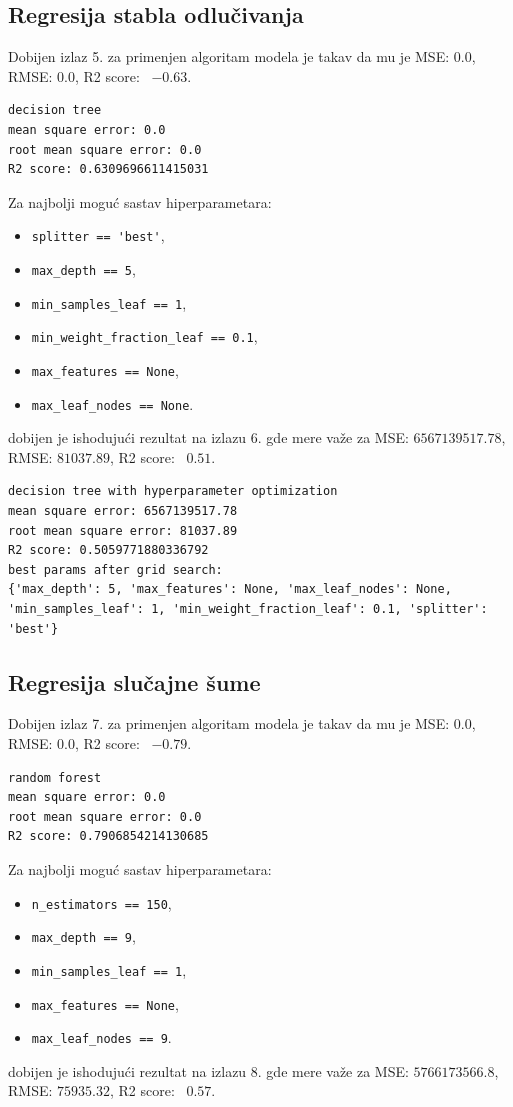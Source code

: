 \documentclass[fontsize=12bp, paper=a4]{scrarticle}
\begin{document}
\subsection{Regresija stabla odlučivanja}
Dobijen izlaz 5. za primenjen algoritam  modela je takav da mu je MSE: $0.0$, RMSE: $0.0$, R2 score: ~$-0.63$.
\begin{lstlisting}[caption=\centering Stabla odlučivanja]
decision tree
mean square error: 0.0
root mean square error: 0.0
R2 score: 0.6309696611415031
\end{lstlisting}

Za najbolji moguć sastav hiperparametara:
\begin{itemize}
    \item \verb|splitter == 'best'|,
    \item \verb|max_depth == 5|,
    \item \verb|min_samples_leaf == 1|,
    \item \verb|min_weight_fraction_leaf == 0.1|,
    \item \verb|max_features == None|,
    \item \verb|max_leaf_nodes == None|.
\end{itemize}
dobijen je ishodujući rezultat na izlazu 6. gde mere važe za MSE: $6567139517.78$, RMSE: $81037.89$, R2 score: ~$0.51$.
\begin{lstlisting}[caption=\centering Stabla odlučivanja sa optimizacijom hiperparametrima]
decision tree with hyperparameter optimization
mean square error: 6567139517.78
root mean square error: 81037.89
R2 score: 0.5059771880336792
best params after grid search: 
{'max_depth': 5, 'max_features': None, 'max_leaf_nodes': None, 'min_samples_leaf': 1, 'min_weight_fraction_leaf': 0.1, 'splitter': 'best'}
\end{lstlisting}

\subsection{Regresija slučajne šume}
Dobijen izlaz 7. za primenjen algoritam  modela je takav da mu je MSE: $0.0$, RMSE: $0.0$, R2 score: ~$-0.79$.

\begin{lstlisting}[caption=\centering Slučajne šume]
random forest
mean square error: 0.0
root mean square error: 0.0
R2 score: 0.7906854214130685
\end{lstlisting}
Za najbolji moguć sastav hiperparametara:
\begin{itemize}
    \item \verb|n_estimators == 150|,
    \item \verb|max_depth == 9|,
    \item \verb|min_samples_leaf == 1|,
    \item \verb|max_features == None|,
    \item \verb|max_leaf_nodes == 9|.
\end{itemize}
dobijen je ishodujući rezultat na izlazu 8. gde mere važe za MSE: $5766173566.8$, RMSE: $75935.32$, R2 score: ~$0.57$.
\end{document}
